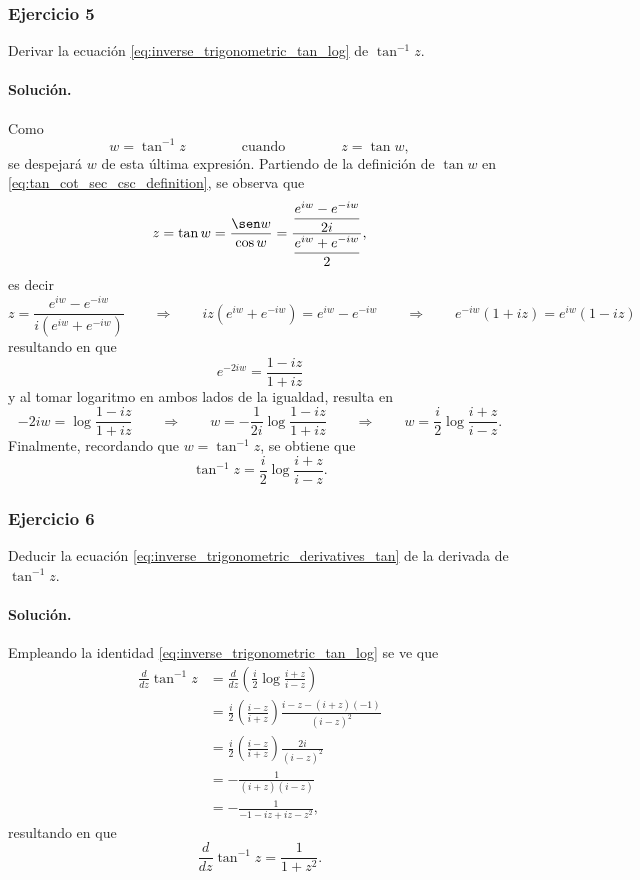 \documentclass[a4paper]{report}
\begin{document}
\subsubsection{Ejercicio 5}

Derivar la ecuación \ref{eq:inverse_trigonometric_tan_log} de \(\tan^{-1}z\).

\paragraph{Solución.} Como
\[
 w=\tan^{-1}z
 \qquad\qquad\textrm{cuando}\qquad\qquad
 z=\tan w,
\]
se despejará \(w\) de esta última expresión. Partiendo de la definición de \(\tan w\) en  \ref{eq:tan_cot_sec_csc_definition}, se observa que 
\[
 z=\tan w=\frac{\sen w}{\cos w}=\dfrac{\dfrac{e^{iw}-e^{-iw}}{2i}}{\dfrac{e^{iw}+e^{-iw}}{2}},
\]
es decir
\[
 z=\frac{e^{iw}-e^{-iw}}{i(e^{iw}+e^{-iw})}
 \qquad\Rightarrow\qquad 
 iz(e^{iw}+e^{-iw})=e^{iw}-e^{-iw}
 \qquad\Rightarrow\qquad 
 e^{-iw}(1+iz)=e^{iw}(1-iz)
\]
resultando en que 
\[
 e^{-2iw}=\frac{1-iz}{1+iz}
\]
y al tomar logaritmo en ambos lados de la igualdad, resulta en
\[
 -2iw=\log\frac{1-iz}{1+iz}
 \qquad\Rightarrow\qquad 
 w=-\frac{1}{2i}\log\frac{1-iz}{1+iz}
 \qquad\Rightarrow\qquad 
 w=\frac{i}{2}\log\frac{i+z}{i-z}.
\]
Finalmente, recordando que \(w=\tan^{-1}z\), se obtiene que 
\[
 \tan^{-1}z=\frac{i}{2}\log\frac{i+z}{i-z}.
\]

\subsubsection{Ejercicio 6}

Deducir la ecuación \ref{eq:inverse_trigonometric_derivatives_tan} de la derivada de \(\tan^{-1}z\).

\paragraph{Solución.} Empleando la identidad \ref{eq:inverse_trigonometric_tan_log} se ve que 
\begin{align*}
 \frac{d}{dz}\tan^{-1}z&=\frac{d}{dz}\left(\frac{i}{2}\log\frac{i+z}{i-z}\right)\\
   &=\frac{i}{2}\left(\frac{i-z}{i+z}\right)\frac{i-z-(i+z)(-1)}{(i-z)^2}\\
   &=\frac{i}{2}\left(\frac{i-z}{i+z}\right)\frac{2i}{(i-z)^2}\\
   &=-\frac{1}{(i+z)(i-z)}\\
   &=-\frac{1}{-1-iz+iz-z^2},
\end{align*}
resultando en que 
\[
 \frac{d}{dz}\tan^{-1}z=\frac{1}{1+z^2}.
\]
\end{document}
